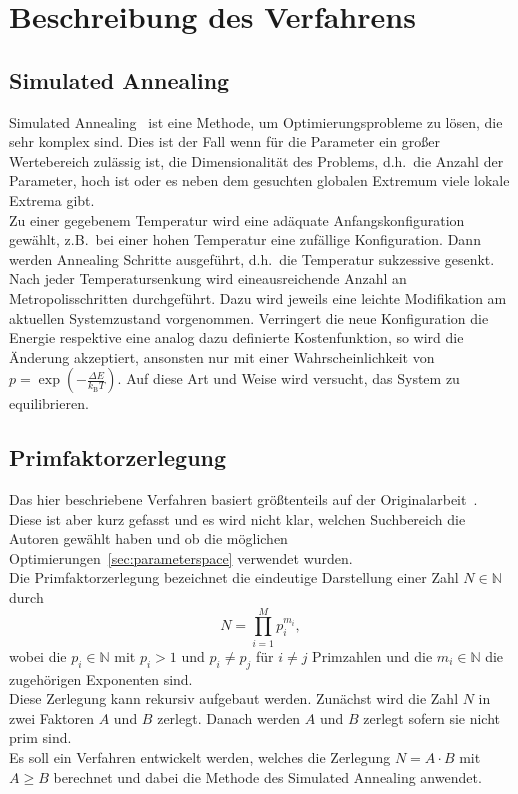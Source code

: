 \chapter{Beschreibung des Verfahrens}\label{ch:algorithm}

\section{Simulated Annealing}
Simulated Annealing~\parencite{nr} ist eine Methode, um Optimierungsprobleme zu lösen, die sehr komplex sind. Dies ist der Fall wenn für die Parameter ein großer Wertebereich zulässig ist, die Dimensionalität des Problems, d.h.\ die Anzahl der Parameter, hoch ist oder es neben dem gesuchten globalen Extremum viele lokale Extrema gibt. \\
Zu einer gegebenem Temperatur wird eine adäquate Anfangskonfiguration gewählt, z.B.\ bei einer hohen Temperatur eine zufällige Konfiguration. Dann werden Annealing Schritte ausgeführt, d.h.\ die Temperatur sukzessive gesenkt. Nach jeder Temperatursenkung wird eineausreichende Anzahl an Metropolisschritten durchgeführt. Dazu wird jeweils eine leichte Modifikation am aktuellen Systemzustand vorgenommen. Verringert die neue Konfiguration die Energie respektive eine analog dazu definierte Kostenfunktion, so wird die Änderung akzeptiert, ansonsten nur mit einer Wahrscheinlichkeit von $p=\exp\left(-\frac{\Delta E}{k_\mathrm{B}T}\right)$. Auf diese Art und Weise wird versucht, das System zu equilibrieren.

\section{Primfaktorzerlegung}
Das hier beschriebene Verfahren basiert größtenteils auf der Originalarbeit~\parencite{altschuler}. Diese ist aber kurz gefasst und es wird nicht klar, welchen Suchbereich die Autoren gewählt haben und ob die möglichen Optimierungen~\ref{sec:parameterspace} verwendet wurden.\\
Die Primfaktorzerlegung bezeichnet die eindeutige Darstellung einer Zahl $N\in\mathbb{N}$ durch
\begin{equation*}
  N=\prod\limits_{i=1}^M p_i^{m_i},
\end{equation*}
wobei die $p_i\in\mathbb{N}$ mit $p_i>1$ und $p_i\neq p_j$ für $i\neq j$ Primzahlen und die $m_i\in\mathbb{N}$ die zugehörigen Exponenten sind.\\
Diese Zerlegung kann rekursiv aufgebaut werden. Zunächst wird die Zahl $N$ in zwei Faktoren $A$ und $B$ zerlegt. Danach werden $A$ und $B$ zerlegt sofern sie nicht prim sind.\\
Es soll ein Verfahren entwickelt werden, welches die Zerlegung $N=A\cdot B$ mit $A\geq B$ berechnet und dabei die Methode des Simulated Annealing anwendet.\\

